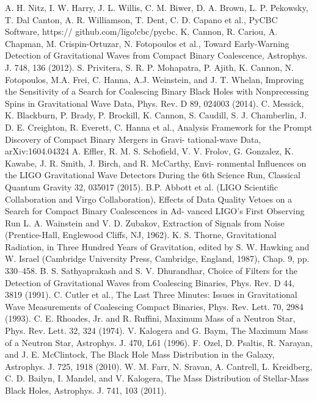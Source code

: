 \documentclass[binding=0.6cm, LaM]{sapthesis}
\begin{document}
\begin{thebibliography}{500}
         A. H. Nitz, I. W. Harry, J. L. Willis, C. M. Biwer, D. A. Brown, L. P. Pekowsky, T. Dal Canton, A. R. Williamson, T. Dent, C. D. Capano et al., PyCBC Software, https:// github.com/ligo!cbc/pycbc.
         K. Cannon, R. Cariou, A. Chapman, M. Crispin-Ortuzar, N. Fotopoulos et al., Toward Early-Warning Detection of Gravitational Waves from Compact Binary Coalescence, Astrophys. J. 748, 136 (2012).
 	 S. Privitera, S. R. P. Mohapatra, P. Ajith, K. Cannon, N. Fotopoulos, M.A. Frei, C. Hanna, A.J. Weinstein, and J. T. Whelan, Improving the Sensitivity of a Search for Coalescing Binary Black Holes with Nonprecessing Spins in Gravitational Wave Data, Phys. Rev. D 89, 024003 (2014).
          C. Messick, K. Blackburn, P. Brady, P. Brockill, K. Cannon, S. Caudill, S. J. Chamberlin, J. D. E. Creighton, R. Everett, C. Hanna et al., Analysis Framework for the Prompt Discovery of Compact Binary Mergers in Gravi- tational-wave Data, arXiv:1604.04324
          A. Effler, R. M. S. Schofield, V. V. Frolov, G. Gonzalez, K. Kawabe, J. R. Smith, J. Birch, and R. McCarthy, Envi- ronmental Influences on the LIGO Gravitational Wave Detectors During the 6th Science Run, Classical Quantum Gravity 32, 035017 (2015). 
         B.P. Abbott et al. (LIGO Scientific Collaboration and Virgo Collaboration), Effects of Data Quality Vetoes on a Search for Compact Binary Coalescences in Ad- vanced LIGO’s First Observing Run 
         L. A. Wainstein and V. D. Zubakov, Extraction of Signals from Noise (Prentice-Hall, Englewood Cliffs, NJ, 1962). 
          K. S. Thorne, Gravitational Radiation, in Three Hundred Years of Gravitation, edited by S. W. Hawking and W. Israel (Cambridge University Press, Cambridge, England, 1987), Chap. 9, pp. 330–458. 
         B. S. Sathyaprakash and S. V. Dhurandhar, Choice of Filters for the Detection of Gravitational Waves from Coalescing Binaries, Phys. Rev. D 44, 3819 (1991). 
 	 C. Cutler et al., The Last Three Minutes: Issues in Gravitational Wave Measurements of Coalescing Compact Binaries, Phys. Rev. Lett. 70, 2984 (1993).
 	 C. E. Rhoades, Jr. and R. Ruffini, Maximum Mass of a Neutron Star, Phys. Rev. Lett. 32, 324 (1974). 
	 V. Kalogera and G. Baym, The Maximum Mass of a Neutron Star, Astrophys. J. 470, L61 (1996). 
	 F. Ozel, D. Psaltis, R. Narayan, and J. E. McClintock, The Black Hole Mass Distribution in the Galaxy, Astrophys. J. 725, 1918 (2010). 
	 W. M. Farr, N. Sravan, A. Cantrell, L. Kreidberg, C. D. Bailyn, I. Mandel, and V. Kalogera, The Mass Distribution of Stellar-Mass Black Holes, Astrophys. J. 741, 103 (2011). 

\end{thebibliography}
\end{document}

